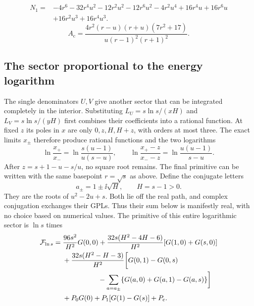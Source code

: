 \begin{equation}
\begin{aligned}
N_{1}={}& - 4 r^{6} - 32 r^{4} u^{2} - 12 r^{2} u^{2} - 12 r^{6} u^{2} - 4 r^{2} u^{4} + 16 r^{4} u + 16 r^{6} u\\
& + 16 r^{2} u^{3} + 16 r^{4} u^{3}.
\end{aligned}
\end{equation}
\begin{equation}
A_{\mathrm c}=\frac{4 r^{2} \left(r - u\right) \left(r + u\right) \left(7 r^{2} + 17\right)}{u \left(r - 1\right)^{2} \left(r + 1\right)^{2}}.
\end{equation}

\subsection{The sector proportional to the energy logarithm}
The single denominators $U,V$ give another sector that can be
integrated completely in the interior. Substituting
$L_U=s\ln s/(xH)$ and $L_V=s\ln s/(yH)$ first combines their
coefficients into a rational function. At fixed $z$ its poles in
$x$ are only $0,z,H,H+z$, with orders at most three. The exact
limits $x_\pm$ therefore produce rational functions and the two
logarithms
\begin{equation}
 \ln\frac{x_+}{x_-}
   =\ln\frac{s(u-1)}{u(s-u)},\qquad
 \ln\frac{x_+-z}{x_--z}
   =\ln\frac{u(u-1)}{s-u}.
\end{equation}
After $z=s+1-u-s/u$, no square root remains. The final primitive
can be written with the same basepoint $r=\sqrt{s}$ as above.
Define the conjugate letters
\begin{equation}
 a_\pm=1\pm\ii\sqrt H,\qquad H=s-1>0.
\end{equation}
They are the roots of $u^2-2u+s$. Both lie off the real path,
and complex conjugation exchanges their GPLs. Thus their sum
below is manifestly real, with no choice based on numerical values.
The primitive of this entire logarithmic sector is $\ln s$ times
\begin{align}
 \mathcal F_{\ln s}={}&\frac{96s^2}{H^2}G(0,0)
 +\frac{32s(H^2-4H-6)}{H^2}[G(1,0)+G(s,0)]\\
 &+\frac{32s(H^2-H-3)}{H^2}\biggl[
 G(0,1)-G(0,s)\\
 &\hspace{18mm}{}-\sum_{a=a_\pm}
       \{G(a,0)+G(a,1)-G(a,s)\}\biggr]\\
 &+P_0G(0)+P_1[G(1)-G(s)]+P_{\mathrm c}.
 \label{eq:comp-real-log-s-primitive}
\end{align}
